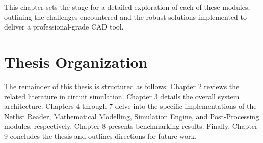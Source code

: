 This chapter sets the stage for a detailed exploration of each of these modules, outlining the challenges encountered and the robust solutions implemented to deliver a professional-grade CAD tool.

\section{Thesis Organization}
The remainder of this thesis is structured as follows: Chapter 2 reviews the related literature in circuit simulation. Chapter 3 details the overall system architecture. Chapters 4 through 7 delve into the specific implementations of the Netlist Reader, Mathematical Modelling, Simulation Engine, and Post-Processing modules, respectively. Chapter 8 presents benchmarking results. Finally, Chapter 9 concludes the thesis and outlines directions for future work.

